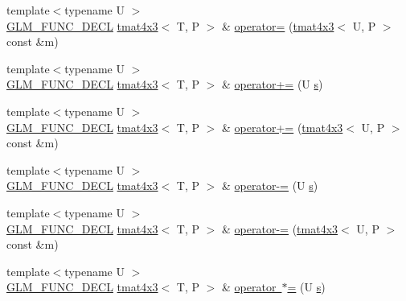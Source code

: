 \begin{DoxyCompactItemize}
\item 
{\footnotesize template$<$typename U $>$ }\\\mbox{\hyperlink{setup_8hpp_ab2d052de21a70539923e9bcbf6e83a51}{G\+L\+M\+\_\+\+F\+U\+N\+C\+\_\+\+D\+E\+CL}} \mbox{\hyperlink{structglm_1_1tmat4x3}{tmat4x3}}$<$ T, P $>$ \& \mbox{\hyperlink{structglm_1_1tmat4x3_a1a8400e31fd17c23aff288242b7a78ca}{operator=}} (\mbox{\hyperlink{structglm_1_1tmat4x3}{tmat4x3}}$<$ U, P $>$ const \&m)
\item 
{\footnotesize template$<$typename U $>$ }\\\mbox{\hyperlink{setup_8hpp_ab2d052de21a70539923e9bcbf6e83a51}{G\+L\+M\+\_\+\+F\+U\+N\+C\+\_\+\+D\+E\+CL}} \mbox{\hyperlink{structglm_1_1tmat4x3}{tmat4x3}}$<$ T, P $>$ \& \mbox{\hyperlink{structglm_1_1tmat4x3_a24679f2dacf9cc1f8f708f40bb1f3aab}{operator+=}} (U \mbox{\hyperlink{glad_8h_af1b1d5edfea6a34daee7389b1b5810ad}{s}})
\item 
{\footnotesize template$<$typename U $>$ }\\\mbox{\hyperlink{setup_8hpp_ab2d052de21a70539923e9bcbf6e83a51}{G\+L\+M\+\_\+\+F\+U\+N\+C\+\_\+\+D\+E\+CL}} \mbox{\hyperlink{structglm_1_1tmat4x3}{tmat4x3}}$<$ T, P $>$ \& \mbox{\hyperlink{structglm_1_1tmat4x3_a74f871665b46c2f00ef0bd0267816e4b}{operator+=}} (\mbox{\hyperlink{structglm_1_1tmat4x3}{tmat4x3}}$<$ U, P $>$ const \&m)
\item 
{\footnotesize template$<$typename U $>$ }\\\mbox{\hyperlink{setup_8hpp_ab2d052de21a70539923e9bcbf6e83a51}{G\+L\+M\+\_\+\+F\+U\+N\+C\+\_\+\+D\+E\+CL}} \mbox{\hyperlink{structglm_1_1tmat4x3}{tmat4x3}}$<$ T, P $>$ \& \mbox{\hyperlink{structglm_1_1tmat4x3_a124dd7f16916a27ab14d698c0760f6f2}{operator-\/=}} (U \mbox{\hyperlink{glad_8h_af1b1d5edfea6a34daee7389b1b5810ad}{s}})
\item 
{\footnotesize template$<$typename U $>$ }\\\mbox{\hyperlink{setup_8hpp_ab2d052de21a70539923e9bcbf6e83a51}{G\+L\+M\+\_\+\+F\+U\+N\+C\+\_\+\+D\+E\+CL}} \mbox{\hyperlink{structglm_1_1tmat4x3}{tmat4x3}}$<$ T, P $>$ \& \mbox{\hyperlink{structglm_1_1tmat4x3_a7c8ddab1781bfac021f6ccb388f4320c}{operator-\/=}} (\mbox{\hyperlink{structglm_1_1tmat4x3}{tmat4x3}}$<$ U, P $>$ const \&m)
\item 
{\footnotesize template$<$typename U $>$ }\\\mbox{\hyperlink{setup_8hpp_ab2d052de21a70539923e9bcbf6e83a51}{G\+L\+M\+\_\+\+F\+U\+N\+C\+\_\+\+D\+E\+CL}} \mbox{\hyperlink{structglm_1_1tmat4x3}{tmat4x3}}$<$ T, P $>$ \& \mbox{\hyperlink{structglm_1_1tmat4x3_aa6744aed1606a66ad04270a978b2ce3b}{operator $\ast$=}} (U \mbox{\hyperlink{glad_8h_af1b1d5edfea6a34daee7389b1b5810ad}{s}})

\end{DoxyCompactItemize}
